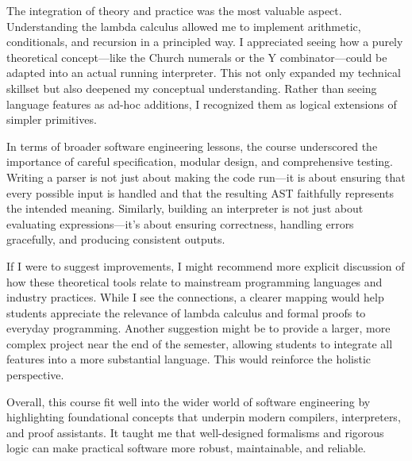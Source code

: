 \documentclass{article}
\theoremstyle{theorem}
\theoremstyle{definition}
\theoremstyle{remark}
\begin{document}
The integration of theory and practice was the most valuable aspect. Understanding the lambda calculus allowed me to implement arithmetic, conditionals, and recursion in a principled way. I appreciated seeing how a purely theoretical concept—like the Church numerals or the Y combinator—could be adapted into an actual running interpreter. This not only expanded my technical skillset but also deepened my conceptual understanding. Rather than seeing language features as ad-hoc additions, I recognized them as logical extensions of simpler primitives.

In terms of broader software engineering lessons, the course underscored the importance of careful specification, modular design, and comprehensive testing. Writing a parser is not just about making the code run—it is about ensuring that every possible input is handled and that the resulting AST faithfully represents the intended meaning. Similarly, building an interpreter is not just about evaluating expressions—it's about ensuring correctness, handling errors gracefully, and producing consistent outputs.

If I were to suggest improvements, I might recommend more explicit discussion of how these theoretical tools relate to mainstream programming languages and industry practices. While I see the connections, a clearer mapping would help students appreciate the relevance of lambda calculus and formal proofs to everyday programming. Another suggestion might be to provide a larger, more complex project near the end of the semester, allowing students to integrate all features into a more substantial language. This would reinforce the holistic perspective.

Overall, this course fit well into the wider world of software engineering by highlighting foundational concepts that underpin modern compilers, interpreters, and proof assistants. It taught me that well-designed formalisms and rigorous logic can make practical software more robust, maintainable, and reliable.
\end{document}
